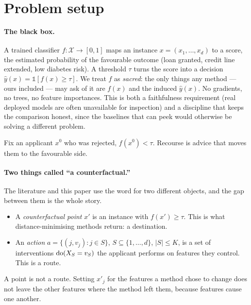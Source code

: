 \section{Problem setup}
\label{sec:problem}

\paragraph{The black box.} A trained classifier $f:\mathcal{X}\to[0,1]$ maps an
instance $x=(x_1,\dots,x_d)$ to a score, the estimated probability of the
favourable outcome (loan granted, credit line extended, low diabetes risk). A
threshold $\tau$ turns the score into a decision
$\hat y(x)=\mathbb{1}[f(x)\ge\tau]$. We treat $f$ as \emph{sacred}: the only
things any method --- ours included --- may ask of it are $f(x)$ and the induced
$\hat y(x)$. No gradients, no trees, no feature importances. This is both a
faithfulness requirement (real deployed models are often unavailable for
inspection) and a discipline that keeps the comparison honest, since the
baselines that can peek would otherwise be solving a different problem.

Fix an applicant $x^{0}$ who was rejected, $f(x^{0})<\tau$. Recourse is advice
that moves them to the favourable side.

\paragraph{Two things called ``a counterfactual.''} The literature and this paper
use the word for two different objects, and the gap between them is the whole
story.
\begin{itemize}
  \item A \emph{counterfactual point} $x'$ is an instance with
    $f(x')\ge\tau$. This is what distance-minimising methods return: a
    destination.
  \item An \emph{action} $a=\{(j,v_j):j\in S\}$, $S\subseteq\{1,\dots,d\}$,
    $|S|\le K$, is a set of interventions $\mathrm{do}(X_S=v_S)$ the applicant
    performs on features they control. This is a route.
\end{itemize}
A point is not a route. Setting $x'_j$ for the features a method chose to change
does not leave the other features where the method left them, because features
cause one another.

